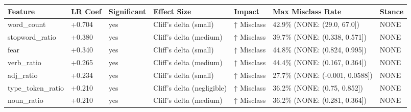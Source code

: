 \begin{tabular}{lllllll}
\toprule
Feature & LR Coef & Significant & Effect Size & Impact & Max Misclass Rate & Stance \\
\midrule
word\_count & +0.704 & yes & Cliff's delta (small) & ↑ Misclass & 42.9\% (NONE: (29.0, 67.0]) & NONE \\
stopword\_ratio & +0.380 & yes & Cliff's delta (medium) & ↑ Misclass & 39.7\% (NONE: (0.338, 0.571]) & NONE \\
fear & +0.340 & yes & Cliff's delta (small) & ↑ Misclass & 44.8\% (NONE: (0.824, 0.995]) & NONE \\
verb\_ratio & +0.265 & yes & Cliff's delta (medium) & ↑ Misclass & 44.4\% (NONE: (0.167, 0.364]) & NONE \\
adj\_ratio & +0.234 & yes & Cliff's delta (small) & ↑ Misclass & 27.7\% (NONE: (-0.001, 0.0588]) & NONE \\
type\_token\_ratio & +0.210 & yes & Cliff's delta (negligible) & ↑ Misclass & 36.2\% (NONE: (0.75, 0.852]) & NONE \\
noun\_ratio & +0.210 & yes & Cliff's delta (medium) & ↑ Misclass & 36.2\% (NONE: (0.281, 0.364]) & NONE \\
\bottomrule
\end{tabular}

